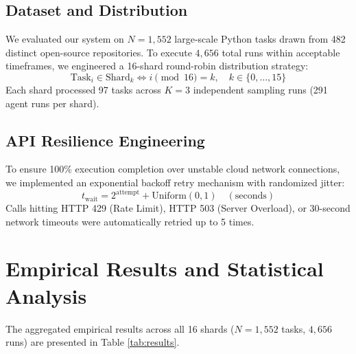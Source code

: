 \documentclass[conference]{IEEEtran}
\begin{document}
\subsection{Dataset and Distribution}
We evaluated our system on $N=1,552$ large-scale Python tasks drawn from 482 distinct open-source repositories. To execute $4,656$ total runs within acceptable timeframes, we engineered a 16-shard round-robin distribution strategy:
\begin{equation}
\text{Task}_i \in \text{Shard}_k \iff i \pmod{16} = k, \quad k \in \{0, \dots, 15\}
\end{equation}
Each shard processed 97 tasks across $K=3$ independent sampling runs (291 agent runs per shard).

\subsection{API Resilience Engineering}
To ensure 100\% execution completion over unstable cloud network connections, we implemented an exponential backoff retry mechanism with randomized jitter:
\begin{equation}
t_{\text{wait}} = 2^{\text{attempt}} + \text{Uniform}(0, 1) \quad (\text{seconds})
\end{equation}
Calls hitting HTTP 429 (Rate Limit), HTTP 503 (Server Overload), or 30-second network timeouts were automatically retried up to 5 times.

\section{Empirical Results and Statistical Analysis}

The aggregated empirical results across all 16 shards ($N=1,552$ tasks, $4,656$ runs) are presented in Table \ref{tab:results}.
\end{document}

